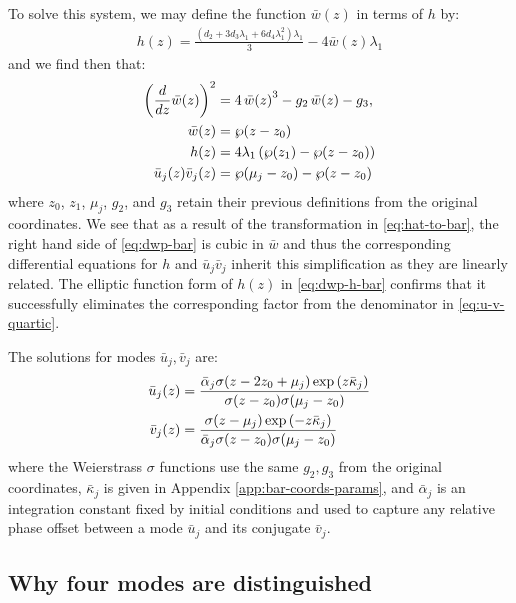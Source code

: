 \documentclass[11pt,a4paper]{article}
\numberwithin{equation}{section}
\begin{document}
To solve this system, we may define the function $\bar{w}(z)$ in terms of $h$ by:
\begin{align}
h{\left(z \right)} = \frac{\left({d}_{2} + 3 {d}_{3} {\lambda}_{1} + 6 {d}_{4} {\lambda}_{1}^{2}\right) {\lambda}_{1}}{3} - 4 \bar{w}{\left(z \right)} {\lambda}_{1}
\end{align}
and we find then that:
\begin{align}
\left(\frac{d}{d z} \bar{w}{\left(z \right)}\right)^{2} &= 4\,\bar{w}{\left(z \right)}^3 - g_2\,\bar{w}{\left(z \right)} - g_3, \notag \\
\bar{w}(z) &= \wp (z - z_0) \label{eq:dwp-bar} \\
h(z) &= 4\lambda_1\left(\wp (z_1) - \wp (z - z_0)\right) \label{eq:dwp-h-bar} \\
\bar{u}_j(z)\bar{v}_j(z) &= \wp(\mu_j - z_0) - \wp(z - z_0)
\end{align}
where $z_0$, $z_1$, $\mu_j$, $g_2$, and $g_3$ retain their previous definitions from the original coordinates.
We see that as a result of the transformation in \eqref{eq:hat-to-bar}, the right hand side of \eqref{eq:dwp-bar} is cubic in $\bar{w}$ and thus the corresponding differential equations for $h$ and $\bar{u}_j\bar{v}_j$ inherit this simplification as they are linearly related.
The elliptic function form of $h(z)$ in \eqref{eq:dwp-h-bar} confirms that it successfully eliminates the corresponding factor from the denominator in \eqref{eq:u-v-quartic}.

The solutions for modes $\bar{u}_j, \bar{v}_j$ are:
\begin{align}
\bar{u}_j(z) &= \frac{\bar{\alpha}_{j} \sigma{\left(z - 2 z_{0} + {\mu}_{j}\right)} \exp{\left( z \bar{\kappa}_j\right)} }{\sigma{\left(z - z_{0}\right)} \sigma{\left({\mu}_{j} - z_{0}\right)}} \notag \\
\bar{v}_j(z) &= \frac{\sigma{\left(z - {\mu}_{j}\right)} \exp{\left(- z \bar{\kappa}_j\right)}}{\bar{\alpha}_{j} \sigma{\left(z - z_{0}\right)} \sigma{\left({\mu}_{j} - z_{0}\right)} } \label{eq:u-v-bar}
\end{align}
where the Weierstrass $\sigma$ functions use the same $g_2,g_3$ from the original coordinates,
$\bar{\kappa}_j$ is given in Appendix \ref{app:bar-coords-params}, and $\bar{\alpha}_j$ is an integration constant fixed by initial conditions and used to capture any relative phase offset between a mode $\bar{u}_j$ and its conjugate $\bar{v}_j$.

\subsection{Why four modes are distinguished}\label{subsec:four-mode-invariance}
\end{document}
